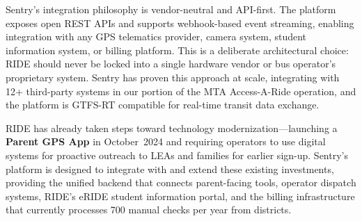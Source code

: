 Sentry's integration philosophy is vendor-neutral and API-first. The platform exposes open REST APIs and supports webhook-based event streaming, enabling integration with any GPS telematics provider, camera system, student information system, or billing platform. This is a deliberate architectural choice: RIDE should never be locked into a single hardware vendor or bus operator's proprietary system. Sentry has proven this approach at scale, integrating with 12+ third-party systems in our portion of the MTA Access-A-Ride operation, and the platform is GTFS-RT compatible for real-time transit data exchange.

\vspace{0.3cm}

RIDE has already taken steps toward technology modernization---launching a \textbf{Parent GPS App} in October~2024 and requiring operators to use digital systems for proactive outreach to LEAs and families for earlier sign-up. Sentry's platform is designed to integrate with and extend these existing investments, providing the unified backend that connects parent-facing tools, operator dispatch systems, RIDE's eRIDE student information portal, and the billing infrastructure that currently processes 700 manual checks per year from districts.

